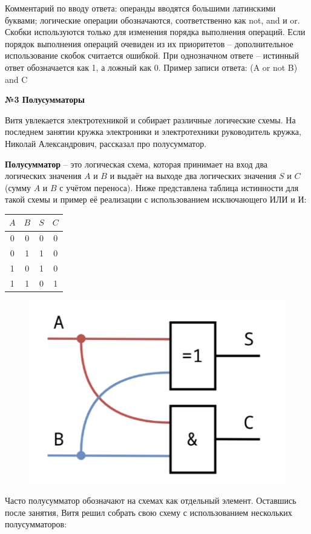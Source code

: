     Комментарий по вводу ответа: операнды вводятся большими латинскими буквами; логические операции обозначаются,
    соответственно как not, and и or.
    Скобки используются только для изменения порядка выполнения операций. Если порядок выполнения операций очевиден из
    их приоритетов – дополнительное использование скобок считается ошибкой.
    При однозначном ответе – истинный ответ обозначается как 1, а ложный как 0.
    Пример записи ответа: (A or not B) and C


    \begin{center}
        \textbf{№3 Полусумматоры}
    \end{center}

    Витя увлекается электротехникой и собирает различные логические схемы. На последнем занятии кружка электроники
    и электротехники руководитель кружка, Николай Александрович, рассказал про полусумматор.

    \textbf{Полусумматор} – это логическая схема, которая принимает на вход два логических значения $A$ и $B$ и выдаёт на выходе
    два логических значения $S$ и $C$ (сумму $A$ и $B$ с учётом переноса). Ниже представлена таблица истинности для такой схемы и
    пример её реализации с использованием исключающего ИЛИ и И:\\

    \begin{tabular}{|c|c|c|c|}
        \hline
        $A$ & $B$ & $S$ & $C$ \\
        \hline
        0   & 0   & 0   & 0   \\
        \hline
        0   & 1   & 1   & 0   \\
        \hline
        1   & 0   & 1   & 0   \\
        \hline
        1   & 1   & 0   & 1   \\
        \hline
    \end{tabular}

    \begin{figure}[h]
        \centering
        \includegraphics[width=0.3  \linewidth]{images/im2}
    \end{figure}

    Часто полусумматор обозначают на схемах как отдельный элемент.
    Оставшись после занятия, Витя решил собрать свою схему с использованием нескольких полусумматоров:

